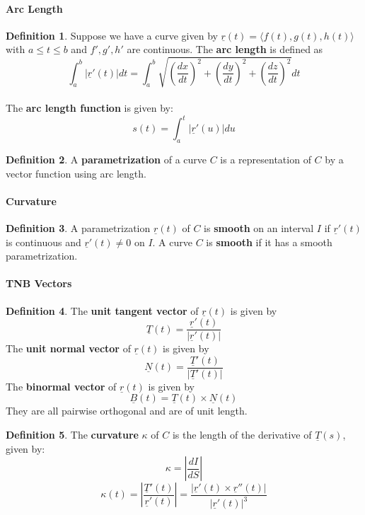 \documentclass[12 pt]{article}
\theoremstyle{definition}
\newtheorem{defn}{Definition}
\begin{document}
\paragraph{Arc Length}
\begin{defn}
	Suppose we have a curve given by $\underline{r}(t)=\langle f(t),g(t),h(t)\rangle$ with $a\leq t \leq b$ and $f',g',h'$ are continuous. The \textbf{arc length} is defined as $$\int_{a}^{b}|\underline{r}'(t)| dt=\int_{a}^{b}\sqrt{\left(\frac{dx}{dt}\right)^2+\left(\frac{dy}{dt}\right)^2+\left(\frac{dz}{dt}\right)^2} dt$$
	\\ The \textbf{arc length function} is given by: $$s(t)=\int_{a}^{t}|\underline{r}'(u)|du$$
\end{defn}
\begin{defn}
	A \textbf{parametrization} of a curve $C$ is a representation of $C$ by a vector function using arc length.
\end{defn}
\paragraph{Curvature} \begin{defn}
A parametrization $\underline{r}(t)$ of $C$ is \textbf{smooth} on an interval $I$ if $\underline{r}'(t)$ is continuous and $\underline{r}'(t)\neq 0$ on $I$. A curve $C$ is \textbf{smooth} if it has a smooth parametrization. 
\end{defn}
\paragraph*{TNB Vectors}
\begin{defn}
	The \textbf{unit tangent vector} of $\underline{r}(t)$ is given by $$\underline{T}(t)=\frac{\underline{r}'(t)}{|\underline{r}'(t)|}$$
	The \textbf{unit normal vector} of $\underline{r}(t)$ is given by $$\underline{N}(t)=\frac{\underline{T}'(t)}{|\underline{T}'(t)|}$$
	The \textbf{binormal vector} of $\underline{r}(t)$ is given by $$\underline{B}(t)=\underline{T}(t)\times \underline{N}(t)$$
	They are all pairwise orthogonal and are of unit length.
\end{defn}
\begin{defn}
	The \textbf{curvature} $\kappa$ of $C$ is the length of the derivative of $\underline{T}(s)$, given by: $$\kappa =\left|\frac{dI}{dS}\right|$$
	$$\kappa (t)=\left|\frac{\underline{T}'(t)}{\underline{r}'(t)}\right|=\frac{|\underline{r}'(t)\times \underline{r}''(t)|}{|\underline{r}'(t)|^3}$$
\end{defn}
\end{document}
